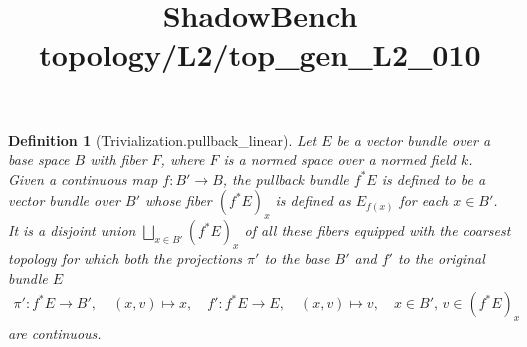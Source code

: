 \documentclass{article}
\title{ShadowBench topology/L2/top\_gen\_L2\_010}
\newtheorem{definition}{Definition}
\begin{document}
\maketitle

\begin{definition}[Trivialization.pullback_linear]
Let $E$ be a vector bundle over a base space $B$ with fiber $F$, where $F$ is a normed space over a normed field $k$. Given a continuous map $f: B' \to B$, the pullback bundle $f^*E$ is defined to be a vector bundle over $B'$ whose fiber $(f^*E)_x$ is defined as $E_{f(x)}$ for each $x \in B'$. It is a disjoint union $\bigsqcup_{x \in B'} (f^*E)_x$ of all these fibers equipped with the coarsest topology for which both the projections $\pi'$ to the base $B'$ and $f'$ to the original bundle $E$
\begin{align*}
    \pi': f^*E \to B', \quad (x,v) \mapsto x, \quad f':f^*E \to E, \quad (x,v) \mapsto v, \quad x \in B',\, v \in (f^*E)_x
\end{align*}
are continuous.
\end{definition}
\end{document}
